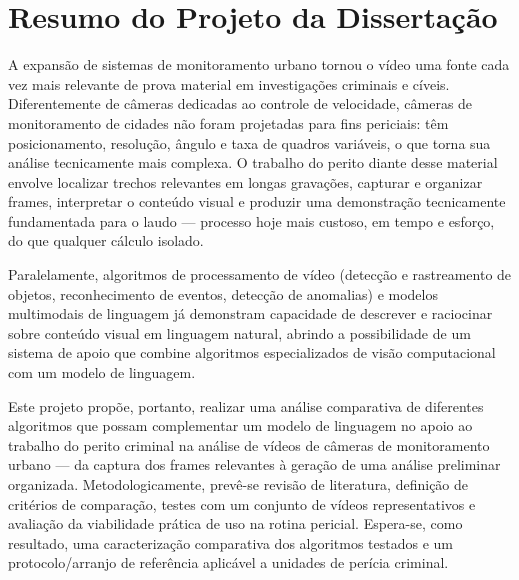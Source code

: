 \section*{Resumo do Projeto da Dissertação}

A expansão de sistemas de monitoramento urbano tornou o vídeo uma fonte cada vez mais relevante de prova material em investigações criminais e cíveis. Diferentemente de câmeras dedicadas ao controle de velocidade, câmeras de monitoramento de cidades não foram projetadas para fins periciais: têm posicionamento, resolução, ângulo e taxa de quadros variáveis, o que torna sua análise tecnicamente mais complexa. O trabalho do perito diante desse material envolve localizar trechos relevantes em longas gravações, capturar e organizar frames, interpretar o conteúdo visual e produzir uma demonstração tecnicamente fundamentada para o laudo --- processo hoje mais custoso, em tempo e esforço, do que qualquer cálculo isolado.

Paralelamente, algoritmos de processamento de vídeo (detecção e rastreamento de objetos, reconhecimento de eventos, detecção de anomalias) e modelos multimodais de linguagem já demonstram capacidade de descrever e raciocinar sobre conteúdo visual em linguagem natural, abrindo a possibilidade de um sistema de apoio que combine algoritmos especializados de visão computacional com um modelo de linguagem.

Este projeto propõe, portanto, realizar uma análise comparativa de diferentes algoritmos que possam complementar um modelo de linguagem no apoio ao trabalho do perito criminal na análise de vídeos de câmeras de monitoramento urbano --- da captura dos frames relevantes à geração de uma análise preliminar organizada. Metodologicamente, prevê-se revisão de literatura, definição de critérios de comparação, testes com um conjunto de vídeos representativos e avaliação da viabilidade prática de uso na rotina pericial. Espera-se, como resultado, uma caracterização comparativa dos algoritmos testados e um protocolo/arranjo de referência aplicável a unidades de perícia criminal.
